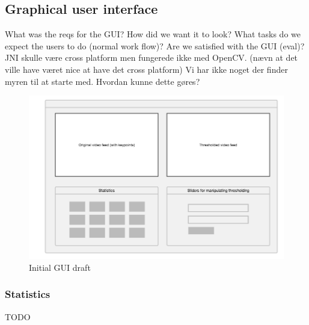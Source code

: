 
\subsection{Graphical user interface}

What was the reqs for the GUI?
How did we want it to look?
What tasks do we expect the users to do (normal work flow)?
Are we satisfied with the GUI (eval)?
JNI skulle være cross platform men fungerede ikke med OpenCV.
(nævn at det ville have været nice at have det cross platform)
Vi har ikke noget der finder myren til at starte med. Hvordan kunne dette gøres?

\begin{figure}[!ht]
    \centering
    \includegraphics[scale = 0.3]{img/termes_gui.png}
    \caption{Initial GUI draft}
\end{figure}

\subsubsection{Statistics} \mbox{}\par

TODO
